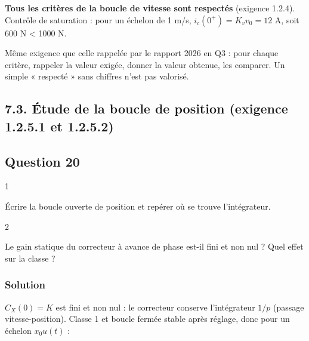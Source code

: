\documentclass[11pt,a4paper]{article}
\newcommand{\equationajustee}[1]{%
  \sbox{\boiteequation}{$\displaystyle #1$}%
  \ifdim\wd\boiteequation>\linewidth
    \[\resizebox{\linewidth}{!}{\usebox{\boiteequation}}\]%
  \else
    \[#1\]%
  \fi}
\begin{document}
\textbf{Tous les critères de la boucle de vitesse sont respectés} (exigence 1.2.4). Contrôle de saturation : pour un échelon de 1 m/s, \(i_c(0^+)=K_vv_0=12\) A, soit 600 N \textless{} 1000 N.

\begin{jury}

Même exigence que celle rappelée par le rapport 2026 en Q3 : pour chaque critère, rappeler la valeur exigée, donner la valeur obtenue, les comparer. Un simple « respecté » sans chiffres n'est pas valorisé.

\end{jury}

\hypertarget{uxe9tude-de-la-boucle-de-position-exigence-1.2.5.1-et-1.2.5.2}{%
\subsection{7.3. Étude de la boucle de position (exigence 1.2.5.1 et 1.2.5.2)}\label{uxe9tude-de-la-boucle-de-position-exigence-1.2.5.1-et-1.2.5.2}}

\hypertarget{question-20}{%
\subsection{Question 20}\label{question-20}}

\begin{indication}{1}

Écrire la boucle ouverte de position et repérer où se trouve l'intégrateur.

\end{indication}

\begin{indication}{2}

Le gain statique du correcteur à avance de phase est-il fini et non nul ? Quel effet sur la classe ?

\end{indication}

\hypertarget{solution-19}{%
\subsubsection{Solution}\label{solution-19}}

\equationajustee{
{\mathrm{FTBO}}_X(p)=K\frac{1+aTp}{1+Tp}\cdot\frac{K_X}{p(1+\tau_Xp)}
}

\(C_X(0)=K\) est fini et non nul : le correcteur conserve l'intégrateur \(1/p\) (passage vitesse-position). Classe 1 et boucle fermée stable après réglage, donc pour un échelon \(x_0u(t)\) :
\end{document}

